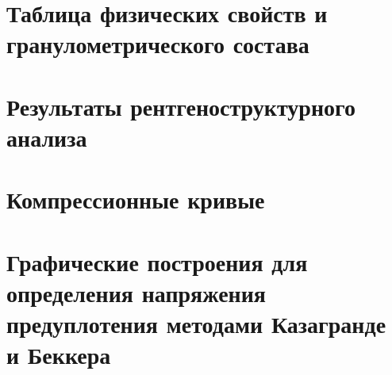 \chapter{Таблица физических свойств и гранулометрического состава}\label{app:tp}

\newpage


\chapter{Результаты рентгеноструктурного анализа}\label{app:ct}


\chapter{Компрессионные кривые}\label{app:ct}


\chapter{Графические построения для определения напряжения предуплотения методами Казагранде и Беккера}\label{app:methods}
